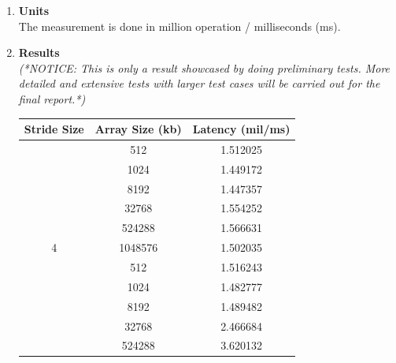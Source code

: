 \begin{enumerate}[\bfseries (a), wide, labelwidth=!, labelindent=0pt]
    
    \item \textbf{Units}\\
    The measurement is done in million operation / milliseconds (ms).
    \item \textbf{Results}\\
    \textit{(*NOTICE: This is only a result showcased by doing preliminary tests. More detailed and extensive tests with larger test cases will be carried out for the final report.*)}
    \vspace{-0.5cm}
\begin{table}[h]
\begin{tabular}{|c|c|c|}
\hline
\textbf{Stride Size}   & \multicolumn{1}{l|}{\textbf{Array Size (kb)}} & \multicolumn{1}{l|}{\textbf{Latency (mil/ms)}} \\ \hline
                       & {\color[HTML]{434343} 512}                    & {\color[HTML]{434343} 1.512025}       \\ \cline{2-3} 
                       & 1024                                          & {\color[HTML]{434343} 1.449172}       \\ \cline{2-3} 
                       & 8192                                          & {\color[HTML]{434343} 1.447357}       \\ \cline{2-3} 
                       & 32768                                         & {\color[HTML]{434343} 1.554252}       \\ \cline{2-3} 
                       & 524288                                        & {\color[HTML]{434343} 1.566631}       \\ \cline{2-3} 
\multirow{-6}{*}{4}    & 1048576                                       & {\color[HTML]{434343} 1.502035}       \\ \hline
                       & {\color[HTML]{434343} 512}                    & {\color[HTML]{434343} 1.516243}       \\ \cline{2-3} 
                       & 1024                                          & {\color[HTML]{434343} 1.482777}       \\ \cline{2-3} 
                       & 8192                                          & {\color[HTML]{434343} 1.489482}       \\ \cline{2-3} 
                       & 32768                                         & {\color[HTML]{434343} 2.466684}       \\ \cline{2-3} 
                       & 524288                                        & {\color[HTML]{434343} 3.620132}       \\ \cline{2-3} 

\end{tabular}
\end{table}
\end{enumerate}
